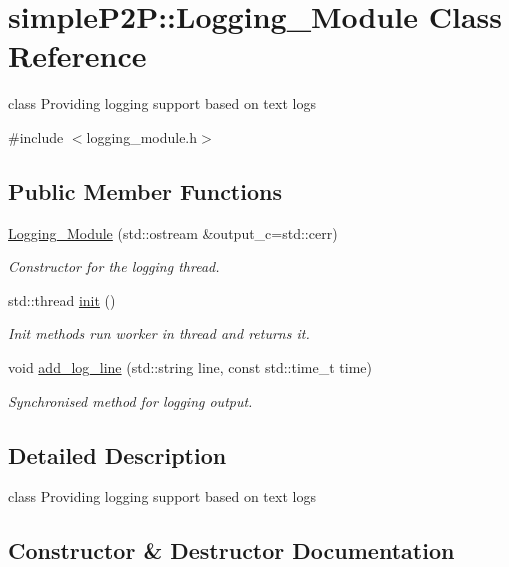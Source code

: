 \hypertarget{classsimpleP2P_1_1Logging__Module}{}\section{simple\+P2P\+:\+:Logging\+\_\+\+Module Class Reference}
\label{classsimpleP2P_1_1Logging__Module}


class Providing logging support based on text logs  




{\ttfamily \#include $<$logging\+\_\+module.\+h$>$}

\subsection*{Public Member Functions}
\begin{DoxyCompactItemize}
\item 
\hyperlink{classsimpleP2P_1_1Logging__Module_a300ea6b6f0c06caa7891c2226fecf67b}{Logging\+\_\+\+Module} (std\+::ostream \&output\+\_\+c=std\+::cerr)
\begin{DoxyCompactList}\small\item\em Constructor for the logging thread. \end{DoxyCompactList}\item 
std\+::thread \hyperlink{classsimpleP2P_1_1Logging__Module_a57e92e151320fd7c811689d831498b6a}{init} ()
\begin{DoxyCompactList}\small\item\em Init methods run worker in thread and returns it. \end{DoxyCompactList}\item 
void \hyperlink{classsimpleP2P_1_1Logging__Module_a5f1eb6d6c66d406f02ae4093cc7657ec}{add\+\_\+log\+\_\+line} (std\+::string line, const std\+::time\+\_\+t time)
\begin{DoxyCompactList}\small\item\em Synchronised method for logging output. \end{DoxyCompactList}\end{DoxyCompactItemize}


\subsection{Detailed Description}
class Providing logging support based on text logs 

\subsection{Constructor \& Destructor Documentation}
\mbox{\label{classsimpleP2P_1_1Logging__Module_a300ea6b6f0c06caa7891c2226fecf67b}} 
